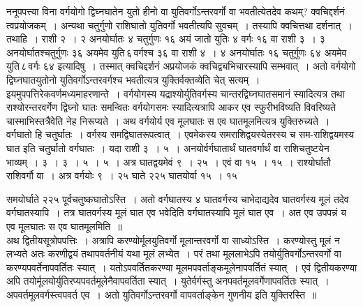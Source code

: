\documentclass[11pt, openany]{book}
\begin{document}
 ननूपपत्त्या विना वर्गयोगो द्विघ्नघातेन युतो हीनो वा 
युतिवर्गोऽन्तरवर्गो वा भवतीत्येतदेव कथम्? क्वचिद्दर्शनं त्वप्रयोजकम्~। 
अन्यथा चतुर्गुणो राशिघातो युतिवर्गो भवतीत्यपि सुवचम्~। तस्यापि
क्वचित्तथा दर्शनात्~। तथाहि~। राशी २~। २ अनयोर्घातः ४ चतुर्गुणः १६ अयं जातो युतिः ४ वर्गः १६ वा राशी ३~। ३ अनयोर्घातश्चतुर्गुणः ३६ अयमेव युति\textendash \,६\textendash \,वर्गश्च ३६ वा राशी ४~। ४ अनयोर्घातः १६ चतुर्गुणः ६४ अयमेव युति\textendash \,८\textendash \,वर्गः ६४ इत्यादिषु~। तस्मात् क्वचिद्दर्शनं अप्रयोजकं क्वचिद्व्यभिचारस्यापि सम्भवात्~। अतो वर्गयोगो द्विघ्नघातयुतोनो युतिवर्गोऽन्तरवर्गश्च भवतीत्यत्र युक्तिर्वक्तव्येति चेत् सत्यम्~। इयमुपपत्तिरेकवर्णमध्यमाहरणान्ते~। वर्गयोगस्य यद्राश्योर्युतिवर्गस्य 
चान्तरद्विघ्नघातसमानं स्यादित्यत्र तथा राश्योरन्तरवर्गेण द्विघ्नो घातः
समन्वितः वर्गयोगसमः स्यादित्यत्रापि आकर एव स्फुरीभविष्यति विवरिष्यते
चास्माभिस्तत्रैवेति नेह निरूप्यते~। अथ वर्गयोर्य एव मूलघातः स एव घातमूलमित्यत्र
युक्तिरुच्यते~। वर्गघातो हि चतुर्घातः~। वर्गस्य समद्विघातरूपत्वात्~। एवमेकस्य समराशिद्वयस्येतरस्य च सम-राशिद्वयमस्य घात इति चतुर्घातो वर्गघातः~। यदा राशी ३~। ५~। अनयोर्वर्गघातार्थं घातवर्गार्थं वा राशिचतुष्टयेन भाव्यम्~। ३~। ३~। 
५~। ५~। अत्र घातद्वयमेवं ९~। २५~। एवं वा १५~। १५~। राश्योर्घातौ 
राशिवर्गौ वा~। अत्र वर्गयोः ९~। २५ घाते २२५ घातयोर्वा १५~। १५
\newpage

\noindent समयोर्घाते २२५ पूर्वचतुष्कघातोऽस्ति~। अतो वर्गघातस्य ४ घातवर्गस्य चाभेदाद्यदेव घातवर्गस्य मूलं तदेव वर्गघातस्यापि~। तत्र घातवर्गस्य मूलं घात एव भवेदिति वर्गघातस्यापि मूलं घात एव~। अत एव उपपन्नं य एव 
मूलघातः स एव घातमूलमिति~॥ \\

\vspace{-3mm}
 अथ द्वितीयसूत्रोपपत्तिः~। अत्रापि करण्योर्मूलयुतिवर्गो मूलान्तरवर्गो वा
साध्योऽस्ति~। करण्योस्तु मूलं न लभ्यते अतः करणीद्वयं तथापवर्तनीयं यथा 
मूलं लभ्येत~। परं तथा मूललाभेऽपि तयोर्युतिवर्गोऽन्तरवर्गो वा
करण्यपवर्तेनापवर्तितः स्यात्~। यतोऽपवर्तितकरण्या मूलमपवर्ताङ्कमूलेनापवर्तितं स्यात्~।
एवं द्वितीयकरण्या अपि तयोर्मूलयोर्युतिरप्यपवर्तमूलेनैवापवर्तिता स्यात्~।
युतेर्वर्गस्तु अनपवर्तमूलवर्गेणापवर्तितः स्यात्~। अपवर्तमूलवर्गस्त्वपवर्त एव~। अतो
युतिवर्गोऽन्तरवर्गो वापवर्ताङ्केन गुणनीय इति युक्तिरस्ति~॥ \\
\end{document}
